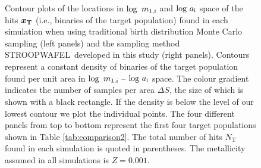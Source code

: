 \documentclass[a4paper,fleqn,usenatbib,useAMS,usedcolumn]{mnras}
\newcommand{\AISs}{\textsc{STROOPWAFEL}}
\begin{document}
\begin{figure}
    \caption{Contour plots of the locations in $\log \ m_{\rm{1,i}}$ and $\log \, a_{\rm{i}}$ space of the hits $\boldsymbol{{x_{\rm{T}}}}$ (i.e., binaries of the target population) found in each simulation when using traditional birth distribution Monte Carlo sampling (left panels) and the sampling method \AISs \ developed in this study (right panels). Contours represent a constant density of binaries of the target population found per unit area in $\log \ m_{\rm{1,i}}$ -- $\log \, a_{\rm{i}}$ space. The colour gradient indicates the number of samples per area $\Delta S$, the size of which is shown with a black rectangle.  If the density is below the level of our lowest contour we plot the individual points. The four different panels from top to bottom represent the first four target populations shown in Table \ref{tab:comparison2}.  The total number of hits $N_{\text{T}}$ found in each simulation is quoted in  parentheses. The metallicity assumed in all simulations is $Z = 0.001$.    }
    \label{fig:ContourPlotInitial}
\end{figure}
%
\end{document}
